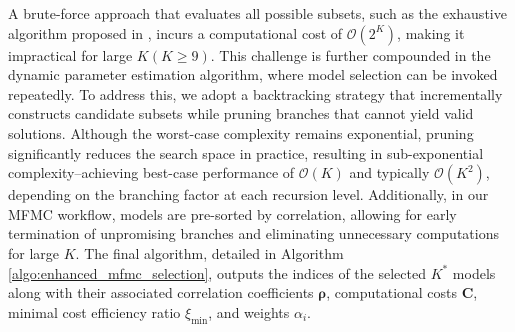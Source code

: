 A brute-force approach that evaluates all possible subsets, such as the exhaustive algorithm proposed in \cite{PeWiGu:2016}, incurs a computational cost of $\mathcal{O}(2^K)$, making it impractical for large $K (K\ge 9)$. This challenge is further compounded in the dynamic parameter estimation algorithm, where model selection can be invoked repeatedly. To address this, we adopt a backtracking strategy that incrementally constructs candidate subsets while pruning branches that cannot yield valid solutions. Although the worst-case complexity remains exponential, pruning significantly reduces the search space in practice, resulting in sub-exponential complexity--achieving best-case performance of $\mathcal{O}(K)$ and typically $\mathcal{O}(K^2)$, depending on the branching factor at each recursion level. Additionally, in our MFMC workflow, models are pre-sorted by correlation, allowing for early termination of unpromising branches and eliminating unnecessary computations for large $K$. The final algorithm, detailed in Algorithm \ref{algo:enhanced_mfmc_selection}, outputs the indices of the selected $K^*$ models along with their associated correlation coefficients $\boldsymbol{\rho}$, computational costs $\boldsymbol{C}$, minimal cost efficiency ratio $\xi_{\text{min}}$, and weights $\alpha_i$.




    

